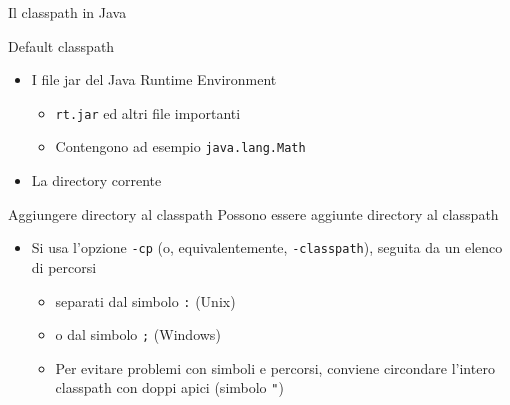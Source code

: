 \documentclass[xcolor=dvipsnames,presentation]{beamer}
\begin{document}
\begin{frame}[allowframebreaks]{Il classpath in Java}
\begin{block}{Default classpath}
        \begin{itemize}
            \item I file jar del Java Runtime Environment
            \begin{itemize}
                \item \texttt{rt.jar} ed altri file importanti
                \item Contengono ad esempio \texttt{java.lang.Math}
            \end{itemize}
            \item La directory corrente
        \end{itemize}
    \end{block}
    \begin{block}{Aggiungere directory al classpath}
        Possono essere aggiunte directory al classpath
        \begin{itemize}
            \item Si usa l'opzione \texttt{-cp} (o, equivalentemente, \texttt{-classpath}), seguita da un elenco di percorsi
            \begin{itemize}
                \item separati dal simbolo \texttt{:} (Unix)
                \item o dal simbolo \texttt{;} (Windows)
                \item Per evitare problemi con simboli e percorsi, conviene circondare l'intero classpath con doppi apici (simbolo \texttt{"})
            \end{itemize}
        \end{itemize}
    \end{block}
\end{frame}
\end{document}
